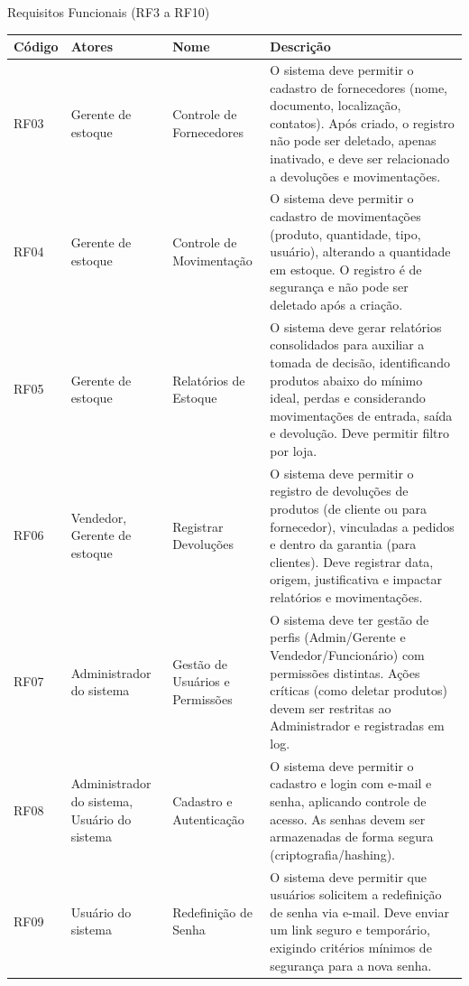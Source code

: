 \documentclass[
	12pt,				%
	openany,			%
	twoside,			%
	a4paper,			%
	english,			%
	brazil				%
	]{abntex2}
\begin{document}
\begin{quadro}[htb]
\caption{\label{quadro_rf2}Requisitos Funcionais (RF3 a RF10)}
\begin{tabular}{|p{1.4cm}|p{2.8cm}|p{4.5cm}|p{7.0cm}|}
    \hline
    \textbf{Código} & \textbf{Atores} & \textbf{Nome} & \textbf{Descrição} \\ \hline

       RF03 & Gerente de estoque & Controle de Fornecedores & O sistema deve permitir o cadastro de fornecedores (nome, documento, localização, contatos). Após criado, o registro não pode ser deletado, apenas inativado, e deve ser relacionado a devoluções e movimentações. \\ \hline

    RF04 & Gerente de estoque & Controle de Movimentação & O sistema deve permitir o cadastro de movimentações (produto, quantidade, tipo, usuário), alterando a quantidade em estoque. O registro é de segurança e não pode ser deletado após a criação. \\ \hline

    RF05 & Gerente de estoque & Relatórios de Estoque & O sistema deve gerar relatórios consolidados para auxiliar a tomada de decisão, identificando produtos abaixo do mínimo ideal, perdas e considerando movimentações de entrada, saída e devolução. Deve permitir filtro por loja. \\ \hline

    RF06 & Vendedor, Gerente de estoque & Registrar Devoluções & O sistema deve permitir o registro de devoluções de produtos (de cliente ou para fornecedor), vinculadas a pedidos e dentro da garantia (para clientes). Deve registrar data, origem, justificativa e impactar relatórios e movimentações. \\ \hline

    RF07 & Administrador do sistema & Gestão de Usuários e Permissões & O sistema deve ter gestão de perfis (Admin/Gerente e Vendedor/Funcionário) com permissões distintas. Ações críticas (como deletar produtos) devem ser restritas ao Administrador e registradas em log. \\ \hline

    RF08 & Administrador do sistema, Usuário do sistema & Cadastro e Autenticação & O sistema deve permitir o cadastro e login com e-mail e senha, aplicando controle de acesso. As senhas devem ser armazenadas de forma segura (criptografia/hashing). \\ \hline

    RF09 & Usuário do sistema & Redefinição de Senha & O sistema deve permitir que usuários solicitem a redefinição de senha via e-mail. Deve enviar um link seguro e temporário, exigindo critérios mínimos de segurança para a nova senha. \\ \hline


\end{tabular}
\end{quadro}
\end{document}
